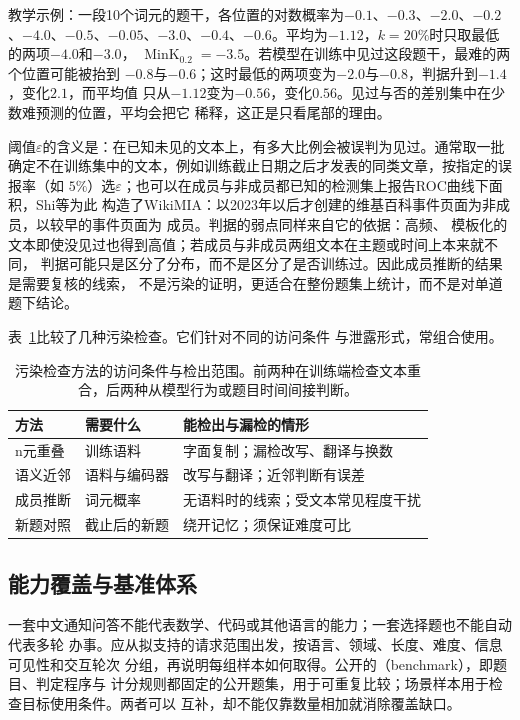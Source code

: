 教学示例：一段10个词元的题干，各位置的对数概率为$-0.1$、$-0.3$、$-2.0$、$-0.2$、$-4.0$、$-0.5$、$-0.05$、$-3.0$、$-0.4$、$-0.6$。平均为$-1.12$，$k=20\%$时只取最低的两项$-4.0$和$-3.0$，
$\operatorname{MinK}_{0.2}=-3.5$。若模型在训练中见过这段题干，最难的两个位置可能被抬到
$-0.8$与$-0.6$；这时最低的两项变为$-2.0$与$-0.8$，判据升到$-1.4$，变化$2.1$，而平均值
只从$-1.12$变为$-0.56$，变化$0.56$。见过与否的差别集中在少数难预测的位置，平均会把它
稀释，这正是只看尾部的理由。

阈值$\varepsilon$的含义是：在已知未见的文本上，有多大比例会被误判为见过。通常取一批
确定不在训练集中的文本，例如训练截止日期之后才发表的同类文章，按指定的误报率（如
$5\%$）选$\varepsilon$；也可以在成员与非成员都已知的检测集上报告ROC曲线下面积，Shi等为此
构造了WikiMIA：以2023年以后才创建的维基百科事件页面为非成员，以较早的事件页面为
成员。判据的弱点同样来自它的依据：高频、
模板化的文本即使没见过也得到高值；若成员与非成员两组文本在主题或时间上本来就不同，
判据可能只是区分了分布，而不是区分了是否训练过。因此成员推断的结果是需要复核的线索，
不是污染的证明，更适合在整份题集上统计，而不是对单道题下结论。

表~\ref{tab:nlp-eval-contamination-methods}比较了几种污染检查。它们针对不同的访问条件
与泄露形式，常组合使用。

\begin{table}[htbp]
 \begin{tabularx}{\linewidth}{@{}p{16mm}p{24mm}X@{}}
  \toprule
  方法 & 需要什么 & 能检出与漏检的情形\\
  \midrule
  n元重叠 & 训练语料 & 字面复制；漏检改写、翻译与换数\\
  语义近邻 & 语料与编码器 & 改写与翻译；近邻判断有误差\\
  成员推断 & 词元概率 & 无语料时的线索；受文本常见程度干扰\\
  新题对照 & 截止后的新题 & 绕开记忆；须保证难度可比\\
  \bottomrule
 \end{tabularx}
 \caption{污染检查方法的访问条件与检出范围。前两种在训练端检查文本重合，后两种从模型行为或题目时间间接判断。}
 \label{tab:nlp-eval-contamination-methods}
\end{table}

\subsection{能力覆盖与基准体系}
\label{sec:nlp-eval-coverage}

一套中文通知问答不能代表数学、代码或其他语言的能力；一套选择题也不能自动代表多轮
办事。应从拟支持的请求范围出发，按语言、领域、长度、难度、信息可见性和交互轮次
分组，再说明每组样本如何取得。公开的（benchmark），即题目、判定程序与
计分规则都固定的公开题集，用于可重复比较；场景样本用于检查目标使用条件。两者可以
互补，却不能仅靠数量相加就消除覆盖缺口。

